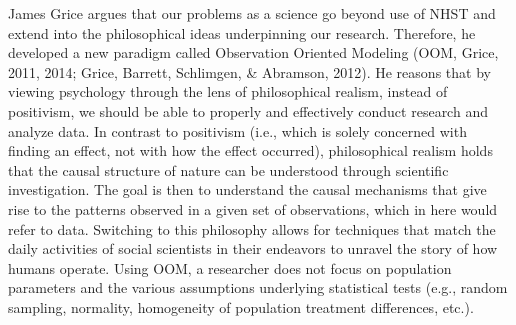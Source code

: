 \documentclass[english,mask,man]{apa6}
\theoremstyle{definition}
\theoremstyle{definition}
\theoremstyle{definition}
\theoremstyle{remark}
\begin{document}
James Grice argues that our problems as a science go beyond use of NHST
and extend into the philosophical ideas underpinning our research.
Therefore, he developed a new paradigm called Observation Oriented
Modeling (OOM, Grice, 2011, 2014; Grice, Barrett, Schlimgen, \&
Abramson, 2012). He reasons that by viewing psychology through the lens
of philosophical realism, instead of positivism, we should be able to
properly and effectively conduct research and analyze data. In contrast
to positivism (i.e., which is solely concerned with finding an effect,
not with how the effect occurred), philosophical realism holds that the
causal structure of nature can be understood through scientific
investigation. The goal is then to understand the causal mechanisms that
give rise to the patterns observed in a given set of observations, which
in here would refer to data. Switching to this philosophy allows for
techniques that match the daily activities of social scientists in their
endeavors to unravel the story of how humans operate. Using OOM, a
researcher does not focus on population parameters and the various
assumptions underlying statistical tests (e.g., random sampling,
normality, homogeneity of population treatment differences, etc.).
\end{document}

